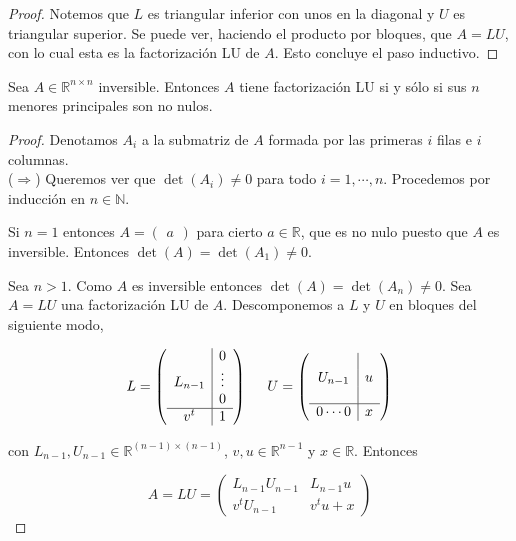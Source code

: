 \begin{propo}
\begin{proof}
Notemos que $L$ es triangular inferior con unos en la diagonal y $U$ es triangular superior. Se puede ver, haciendo el producto por bloques, que $A = LU$, con lo cual esta es la factorización LU de $A$. Esto concluye el paso inductivo.

\end{proof}
\end{propo}

\begin{propo}
\label{propo:lu}

Sea $A \in \mathbb{R}^{n \times n}$ inversible. Entonces $A$ tiene factorización LU si y sólo si sus $n$ menores principales son no nulos.

\begin{proof}
Denotamos $A_i$ a la submatriz de $A$ formada por las primeras $i$ filas e $i$ columnas.\\[0.25cm]
($\Rightarrow$) Queremos ver que $\det(A_i) \neq 0$ para todo $i = 1, \cdots, n$. Procedemos por inducción en $n \in \mathbb{N}$.

Si $n = 1$ entonces $A = \begin{pmatrix} a \end{pmatrix}$ para cierto $a \in \mathbb{R}$, que es no nulo puesto que $A$ es inversible. Entonces $\det(A) = \det(A_1) \neq 0$.

Sea $n > 1$. Como $A$ es inversible entonces $\det(A) = \det(A_n) \neq 0$. Sea $A = LU$ una factorización LU de $A$. Descomponemos a $L$ y $U$ en bloques del siguiente modo,

\[L = \left(\begin{array}{c|c}
 & 0 \\
L_{n - 1} & \vdots \\
 & 0 \\ \hline
v^t & 1
\end{array}\right)
\hspace{0.5cm}
U = \left(\begin{array}{c|c}
 &  \\
U_{n - 1} & u \\
 &  \\ \hline
0 \cdots 0 & x
\end{array}\right)
\]

con $L_{n - 1}, U_{n - 1} \in \mathbb{R}^{(n - 1) \times (n - 1)}$, $v, u \in \mathbb{R}^{n - 1}$ y $x \in \mathbb{R}$. Entonces

\[A = LU = \left(\begin{array}{c|c}
L_{n - 1} U_{n - 1} & L_{n - 1}u\\ \hline
v^t U_{n - 1} & v^tu + x
\end{array}\right)\]


\end{proof}
\end{propo}
